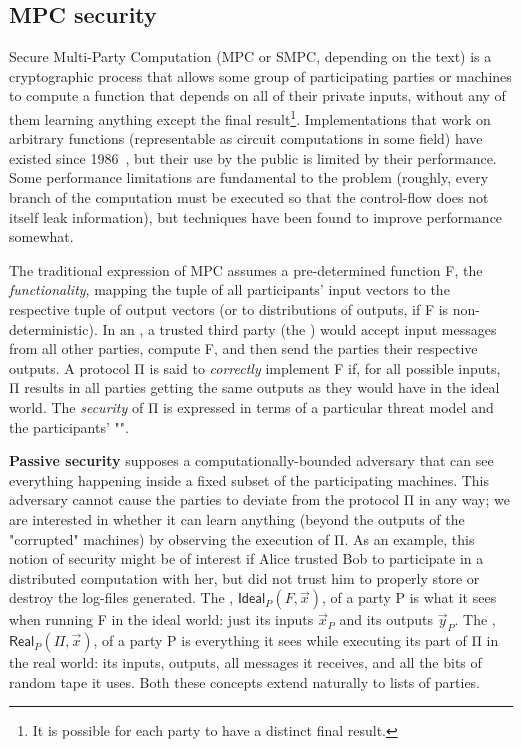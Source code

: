 \documentclass[compsoc, conference, a4paper, 10pt, times]{IEEEtran}
\begin{document}
\subsection{MPC security}

Secure Multi-Party Computation (MPC or SMPC, depending on the text)
is a cryptographic process that allows some group of participating parties or machines
to compute a function that depends on all of their private inputs,
without any of them learning anything except the final result\footnote{
    It is possible for each party to have a distinct final result.
}.
Implementations that work on arbitrary functions (representable as circuit computations in some field)
have existed since 1986~\cite{yao1986generate}, %
but their use by the public is limited by their performance.
Some performance limitations are fundamental to the problem
(roughly, every branch of the computation must be executed so that the control-flow does not itself leak information),
but techniques have been found to improve performance somewhat.

The traditional expression of MPC assumes a pre-determined function F, the \emph{functionality},
mapping the tuple of all participants' input vectors to the respective tuple of output vectors
(or to distributions of outputs, if F is non-deterministic).
In an , a trusted third party (the ) would accept input messages
from all other parties, compute F, and then send the parties their respective outputs.
A  protocol Π is said to \textit{correctly} implement F if, for all possible inputs,
Π results in all parties getting the same outputs as they would have in the ideal world.
The \textit{security} of Π is expressed in terms of a particular threat model and the participants' "".

\textbf{Passive security}
supposes a computationally-bounded adversary
that can see everything happening inside a fixed subset of the participating machines.
This adversary cannot cause the parties to deviate from the protocol Π in any way;
we are interested in whether it can learn anything (beyond the outputs of the "corrupted" machines)
by observing the execution of Π.
As an example, this notion of security might be of interest if Alice trusted Bob to participate
in a distributed computation with her, but did not trust him to properly store or destroy the log-files
generated.
The , $\mathsf{Ideal}_P(F,\vec{x})$, of a party P is what it sees when running F in the ideal world:
just its inputs $\vec{x}_P$ and its outputs $\vec{y}_P$.
The , $\mathsf{Real}_P(Π, \vec{x})$, of a party P is everything it sees while executing its part of Π in the real world:
its inputs, outputs, all messages it receives, and all the bits of random tape it uses.
Both these concepts extend naturally to lists of parties.
\end{document}
